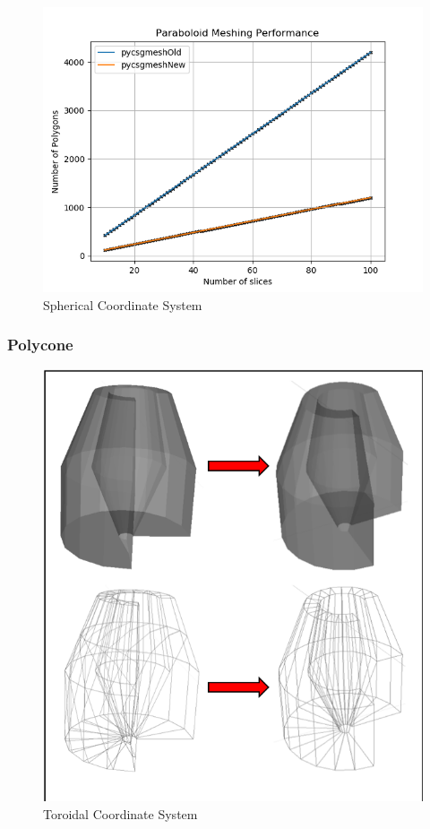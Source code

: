 \documentclass[12pt,a4paper]{article}
\begin{document}
\begin{figure}[h!]
\centering
\includegraphics[scale=0.5]{Images//Quad_fits//Paraboloid_quad.png}
\caption[width=\columnwidth]{Spherical Coordinate System}
\label{conts}
\end{figure}


\subsubsection{Polycone}

\begin{figure}[h!]
\centering
\includegraphics[scale=0.5]{Images//Meshes//polycone.png}
\caption[width=\columnwidth]{Toroidal Coordinate System}
\label{conts}
\end{figure}
\end{document}
